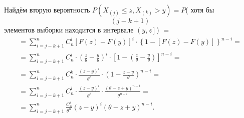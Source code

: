 \begin{enumerate}[label=\alph*)]
  Найдём вторую вероятность
  $P \left( X_{ \left( j \right) } \leq z, X_{ \left( k \right) } > y \right) =
  P$(
    хотя бы
    $$ \left( j - k + 1 \right) $$
    элементов выборки находится в интервале
    $ \left( y, z \right]
  $) $=$
  \begin{equation*}
    \begin{split}
      = \sum \limits_{i = j - k + 1}^n
        C_n^i \left[ F \left( z \right) - F \left( y \right) \right]^i \cdot
        \left\{ 1 - \left[ F \left( z \right) - F \left( y \right) \right] \right\}^{n - i} = \\
      = \sum \limits_{i = j - k + 1}^n
        C_n^i \cdot
        \left( \frac{z}{ \theta } - \frac{y}{ \theta } \right)^i \cdot
        \left[ 1 - \left( \frac{z}{ \theta } - \frac{y}{ \theta } \right) \right]^{n - i} = \\
      = \sum \limits_{i = j - k + 1}^n
        C_n^k \cdot
        \frac{ \left( z - y \right)^i}{ \theta^i} \cdot
        \left( 1 - \frac{z - y}{ \theta } \right)^{n - i} = \\
      = \sum \limits_{i = j - k + 1}^n
        C_n^i \cdot
        \frac{ \left( z - y \right)^i}{ \theta^i} \cdot
        \frac{ \left( \theta - z + y \right)^{n - i}}{ \theta^{n - i}} = \\
      = \sum \limits_{i = j - k + 1}^n
        \frac{C_n^i}{ \theta^n} \left( z - y \right)^i \left( \theta - z + y \right)^{n - i}.
    \end{split}
  \end{equation*}


\end{enumerate}
